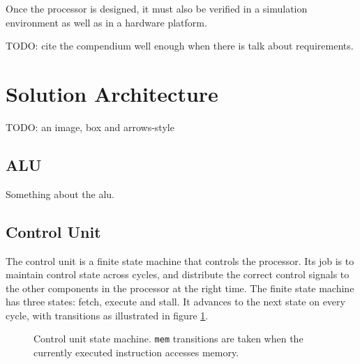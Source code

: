 Once the processor is designed, it must also be verified in a simulation environment as well as in a hardware platform.

TODO: cite the compendium well enough when there is talk about requirements.

\section{Solution Architecture}

TODO: an image, box and arrows-style

\subsection{ALU}

Something about the alu.

\subsection{Control Unit}

The control unit is a finite state machine that controls the processor.
Its job is to maintain control state across cycles, and distribute the correct control signals to the other components in the processor at the right time.
The finite state machine has three states: fetch, execute and stall.
It advances to the next state on every cycle, with transitions as illustrated in figure \ref{figure:control-unit-state-machine}.

\begin{figure}[h]
    \begin{center}
            \caption{
                Control unit state machine.
                \texttt{mem} transitions are taken when the currently executed instruction accesses memory.
            }
            \label{figure:control-unit-state-machine}
    \end{center}
\end{figure}

